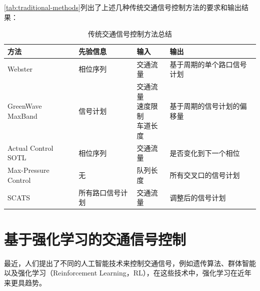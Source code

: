 \autoref{tab:traditional-methods}列出了上述几种传统交通信号控制方法的要求和输出结果：
\begin{table}[htb]
    \caption{传统交通信号控制方法总结\label{tab:traditional-methods}}
    \begin{tabular}{llll}
      \toprule
      方法 & 先验信息 & 输入 & 输出 \\
      \midrule
      Webster & 相位序列 & 交通流量 & 基于周期的单个路口信号计划 \\
      \hline
      \tabincell{l}{GreenWave\\MaxBand} & 信号计划 & \tabincell{l}{交通流量\\速度限制\\车道长度} & 基于周期的信号计划的偏移量 \\
      \hline
      \tabincell{l}{Actual Control\\SOTL} & 相位序列& 交通流量 & 是否变化到下一个相位\\
      \hline
      Max-Pressure Control & 无 & 队列长度 & 所有交叉口的信号计划\\
      \hline
      SCATS & 所有路口信号计划 & 交通流量 & 调整后的信号计划\\
      \bottomrule
    \end{tabular}
\end{table}

\section{基于强化学习的交通信号控制}
最近，人们提出了不同的人工智能技术来控制交通信号，例如遗传算法、群体智能以及强化学习（Reinforcement Learning，RL），在这些技术中，强化学习在近年来更具趋势。
